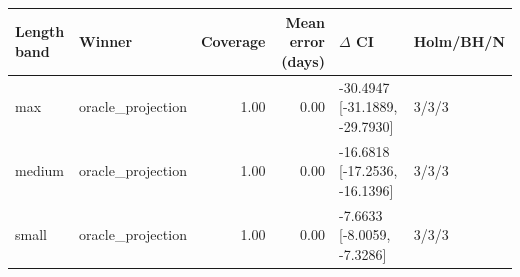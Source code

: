 \begin{tabular}{llrrll}
\toprule
Length band & Winner & Coverage & Mean error (days) & $\Delta$ CI & Holm/BH/N \\
\midrule
max & oracle\_projection & 1.00 & 0.00 & -30.4947 [-31.1889, -29.7930] & 3/3/3 \\
medium & oracle\_projection & 1.00 & 0.00 & -16.6818 [-17.2536, -16.1396] & 3/3/3 \\
small & oracle\_projection & 1.00 & 0.00 & -7.6633 [-8.0059, -7.3286] & 3/3/3 \\
\bottomrule
\end{tabular}

